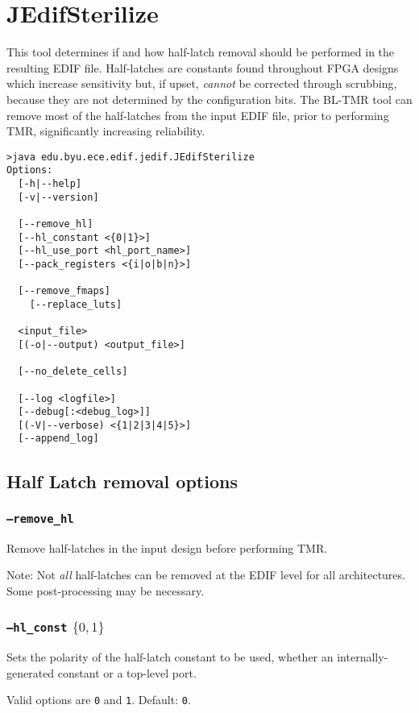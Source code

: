 \section{JEdifSterilize}
This tool determines if and how half-latch removal should be
performed in the resulting EDIF file. Half-latches are constants found
throughout FPGA designs which increase sensitivity but, if upset, \emph{cannot}
be corrected through scrubbing, because they are not determined by the
configuration bits. The BL-TMR tool can remove most of the half-latches from the
input EDIF file, prior to performing TMR, significantly increasing reliability.

\begin{verbatim}
>java edu.byu.ece.edif.jedif.JEdifSterilize
Options:
  [-h|--help]
  [-v|--version]

  [--remove_hl]
  [--hl_constant <{0|1}>]
  [--hl_use_port <hl_port_name>]
  [--pack_registers <{i|o|b|n}>]

  [--remove_fmaps]
	[--replace_luts]

  <input_file>
  [(-o|--output) <output_file>]

  [--no_delete_cells]

  [--log <logfile>]
  [--debug[:<debug_log>]]
  [(-V|--verbose) <{1|2|3|4|5}>]
  [--append_log]

\end{verbatim}
\subsection{Half Latch removal options}

\subsubsection{\texttt{--remove\_hl}}
Remove half-latches in the input design before performing TMR.

Note: Not \emph{all} half-latches can be removed at the EDIF 
level for all architectures. Some post-processing may be necessary.

\subsubsection{\texttt{--hl\_const} $\{0,1\}$}
Sets the polarity of the half-latch constant to be used, whether an 
internally-generated constant or a top-level port. 

Valid options are \texttt{0} and \texttt{1}. Default: \texttt{0}.

